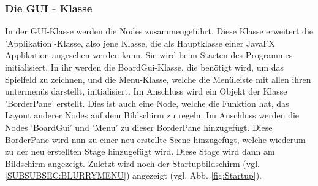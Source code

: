 \documentclass[12pt,a4paper]{article}
\begin{document}
\subsubsection{Die GUI - Klasse}
In der GUI-Klasse werden die Nodes zusammengeführt. Diese Klasse erweitert die 'Applikation'-Klasse, also jene Klasse, die als Hauptklasse einer JavaFX Applikation angesehen werden kann. Sie wird beim Starten des Programmes initialisiert. In ihr werden die BoardGui-Klasse, die benötigt wird, um das Spielfeld zu zeichnen, und die Menu-Klasse, welche die Menüleiste mit allen ihren untermenüs darstellt, initialisiert. Im Anschluss wird ein Objekt der Klasse 'BorderPane' erstellt. Dies ist auch eine Node, welche die Funktion hat, das Layout anderer Nodes auf dem Bildschirm zu regeln. Im Anschluss werden die Nodes 'BoardGui' und 'Menu' zu dieser BorderPane hinzugefügt. Diese BorderPane wird nun zu einer neu erstellte Scene hinzugefügt, welche wiederum zu der neu erstellten Stage hinzugefügt wird. Diese Stage wird dann am Bildschirm angezeigt. 
Zuletzt wird noch der Startupbildschirm (vgl. \ref{SUBSUBSEC:BLURRYMENU}) angezeigt (vgl. Abb. \ref{fig:Startup}).
\end{document}
